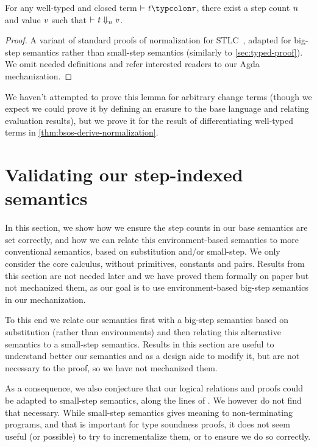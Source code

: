 \begin{theorem}
  \label{thm:bsos-normalization}
For any well-typed and closed term \ensuremath{\vdash\Varid{t}\typcolon\tau}, there exist a step count \ensuremath{\Varid{n}} and value \ensuremath{\Varid{v}} such that \ensuremath{\vdash\Varid{t}\;\negthickspace\Downarrow_{\Varid{n}}\negthickspace\;\Varid{v}}.
\end{theorem}
\begin{proof}
A variant of standard proofs of normalization for
STLC~\citep[Ch.~12]{Pierce02TAPL}, adapted for big-step semantics rather than
small-step semantics (similarly to \cref{sec:typed-proof}).
We omit needed definitions and refer interested readers to our Agda
mechanization.
\end{proof}

We haven't attempted to prove this lemma for arbitrary change terms (though we
expect we could prove it by defining an erasure to the base language and
relating evaluation results), but we prove it for the result of differentiating
well-typed terms in \cref{thm:bsos-derive-normalization}.

\section{Validating our step-indexed semantics}
\label{sec:sanity-check-big-step}
In this section, we show how we ensure the step counts in our
base semantics are set correctly, and how we can relate this
environment-based semantics to more conventional semantics, based
on substitution and/or small-step. We only
consider the core calculus, without primitives, constants and
pairs. Results from this section are not needed later and we have
proved them formally on paper but not mechanized them, as our
goal is to use environment-based big-step semantics in our
mechanization.

To this end we relate our semantics first with
a big-step semantics based on substitution (rather than
environments) and then relating this alternative semantics to a
small-step semantics. Results in this section are useful to
understand better our semantics and as a design aide to modify
it, but are not necessary to the proof, so we have not mechanized
them.

As a consequence, we also conjecture that our logical relations
and proofs could be adapted to small-step semantics, along the lines
of \citet{Ahmed2006stepindexed}. We however do
not find that necessary. While small-step
semantics gives meaning to non-terminating programs, and that is
important for type soundness proofs, it does not seem useful (or
possible) to try to incrementalize them, or to ensure we do so
correctly.

